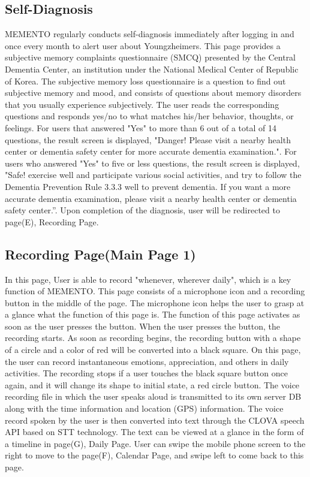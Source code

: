 \documentclass[conference]{IEEEtran}
\begin{document}
\subsection{Self-Diagnosis}
MEMENTO regularly conducts self-diagnosis immediately after logging in and once every month to alert user about Youngzheimers. This page provides a subjective memory complaints questionnaire (SMCQ) presented by the Central Dementia Center, an institution under the National Medical Center of Republic of Korea. The subjective memory loss questionnaire is a question to find out subjective memory and mood, and consists of questions about memory disorders that you usually experience subjectively. The user reads the corresponding questions and responds yes/no to what matches his/her behavior, thoughts, or feelings. For users that answered "Yes" to more than 6 out of a total of 14 questions, the result screen is displayed, "Danger! Please visit a nearby health center or dementia safety center for more accurate dementia examination.". For users who answered "Yes" to five or less questions, the result screen is displayed, "Safe! exercise well and participate various social activities, and try to follow the Dementia Prevention Rule 3.3.3 well to prevent dementia. If you want a more accurate dementia examination, please visit a nearby health center or dementia safety center.”. Upon completion of the diagnosis, user will be redirected to page(E), Recording Page.
\\
\subsection{Recording Page(Main Page 1)}
In this page, User is able to record "whenever, wherever daily", which is a key function of MEMENTO. This page consists of a microphone icon and a recording button in the middle of the page. The microphone icon helps the user to grasp at a glance what the function of this page is. The function of this page activates as soon as the user presses the button. When the user presses the button, the recording starts. As soon as recording begins, the recording button with a shape of a circle and a color of red will be converted into a black square. On this page, the user can record instantaneous emotions, appreciation, and others in daily activities. The recording stops if a user touches the black square button once again, and it will change its shape to initial state, a red circle button. The voice recording file in which the user speaks aloud is transmitted to its own server DB along with the time information and location (GPS) information. The voice record spoken by the user is then converted into text through the CLOVA speech API based on STT technology. The text can be viewed at a glance in the form of a timeline in page(G), Daily Page. User can swipe the mobile phone screen to the right to move to the page(F), Calendar Page, and swipe left to come back to this page.
\\
\end{document}
